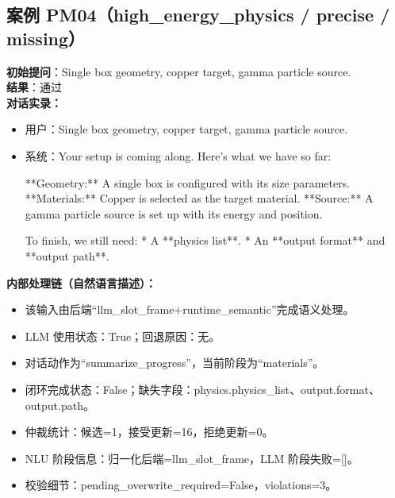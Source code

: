 \documentclass[11pt]{ctexart}
\begin{document}
\subsection{案例 PM04（high\_energy\_physics / precise / missing）}
\textbf{初始提问}：Single box geometry, copper target, gamma particle source.\\
\textbf{结果}：通过\\
\textbf{对话实录：}
\begin{itemize}
\item 用户：Single box geometry, copper target, gamma particle source.
\item 系统：Your setup is coming along. Here's what we have so far:

**Geometry:** A single box is configured with its size parameters.
**Materials:** Copper is selected as the target material.
**Source:** A gamma particle source is set up with its energy and position.

To finish, we still need:
*   A **physics list**.
*   An **output format** and **output path**.
\end{itemize}
\textbf{内部处理链（自然语言描述）：}
\begin{itemize}
\item 该输入由后端“llm\_slot\_frame+runtime\_semantic”完成语义处理。
\item LLM 使用状态：True；回退原因：无。
\item 对话动作为“summarize\_progress”，当前阶段为“materials”。
\item 闭环完成状态：False；缺失字段：physics.physics\_list、output.format、output.path。
\item 仲裁统计：候选=1，接受更新=16，拒绝更新=0。
\item NLU 阶段信息：归一化后端=llm\_slot\_frame，LLM 阶段失败=[]。
\item 校验细节：pending\_overwrite\_required=False，violations=3。
\end{itemize}
\end{document}
